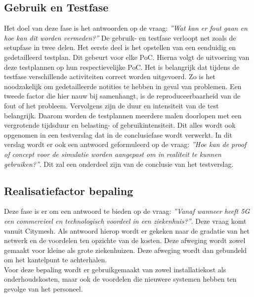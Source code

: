 \subsection{Gebruik en Testfase}
Het doel van deze fase is het antwoorden op de vraag: \textit{''Wat kan er fout gaan en hoe kan dit worden vermeden?''} De gebruik- en testfase verloopt net zoals de setupfase in twee delen. Het eerste deel is het opstellen van een eenduidig en gedetailleerd testplan. Dit gebeurt voor elke PoC. Hierna volgt de uitvoering van deze testplannen op hun respectievelijke PoC. Het is belangrijk dat tijdens de testfase verschillende activiteiten correct worden uitgevoerd. Zo is het noodzakelijk om gedetailleerde notities te hebben in geval van problemen. Een tweede factor die hier nauw bij samenhangt, is de reproduceerbaarheid van de fout of het probleem. Vervolgens zijn de duur en intensiteit van de test belangrijk. Daarom worden de testplannen meerdere malen doorlopen met een vergrotende tijdsduur en belasting- of gebruikintensiteit. Dit alles wordt ook opgenomen in een testverslag dat in de conclusiefase wordt verwerkt. In dit verslag wordt er ook een antwoord geformuleerd op de vraag: \textit{''Hoe kan de proof of concept voor de simulatie worden aangepast om in realiteit te kunnen gebruiken?''}. Dit zal een onderdeel zijn van de conclusie van het testverslag.
\subsection{Realisatiefactor bepaling}
Deze fase is er om een antwoord te bieden op de vraag: \textit{''Vanaf wanneer heeft 5G een commercieel en technologisch voordeel in een ziekenhuis?''}. Deze vraag komt vanuit Citymesh. Als antwoord hierop wordt er gekeken naar de gradatie van het netwerk en de voordelen ten opzichte van de kosten. Deze afweging wordt zowel gemaakt voor kleine als grote ziekenhuizen. Deze afweging wordt dan gebundeld om het kantelpunt te achterhalen. \\ Voor deze bepaling wordt er gebruikgemaakt van zowel installatiekost als onderhoudskosten, maar ook de voordelen die nieuwere systemen hebben ten gevolge van het personeel. 
